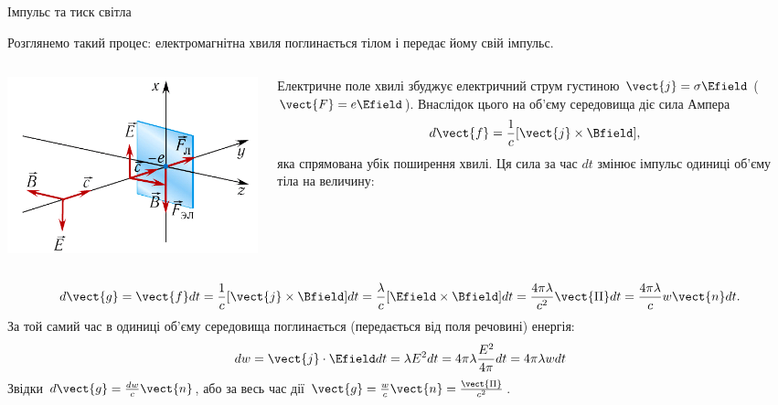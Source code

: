 \documentclass[onlytextwidth]{beamer}
\begin{document}
\begin{frame}{Імпульс та тиск світла}{}
\begin{block}{}
    Розглянемо такий процес: електромагнітна хвиля поглинається тілом і передає йому свій імпульс.
\end{block}
	\begin{columns}
		\begin{column}{0.3\linewidth}
			\begin{center}
				\includegraphics[width=1\linewidth]{pictures/elmagpresure}
			\end{center}
		\end{column}
		\begin{column}{0.7\linewidth}
			\begin{block}{}\justifying\small
				Електричне поле хвилі збуджує електричний струм густиною $ \vect{j} = \sigma\Efield $ ($ \vect{F} = e\Efield $). Внаслідок цього на
				об'єму середовища діє сила Ампера
                \begin{equation*}
                    d\vect{f} = \frac1c[\vect{j}\times\Bfield],
                \end{equation*}
        яка спрямована убік поширення хвилі. Ця сила за час $dt$ змінює імпульс одиниці об'єму тіла на величину:

			\end{block}
		\end{column}
	\end{columns}
\begin{block}{}\justifying
\begin{equation*}
    d\vect{g} = \vect{f} dt =  \frac1c[\vect{j}\times\Bfield] dt = \frac{\lambda}{c}[\Efield \times\Bfield]dt = \frac{4\pi\lambda}{c^2}\vect{\Pi}dt
    =
    \frac{4\pi\lambda}{c} w \vect{n} dt.
\end{equation*}
    За той самий час в одиниці об'єму середовища поглинається (передається від поля речовині) енергія:
\begin{equation*}
    dw = \vect{j}\cdot\Efield dt = \lambda E^2dt = 4\pi\lambda \frac{E^2}{4\pi} dt = 4\pi\lambda w dt
\end{equation*}
Звідки $d\vect{g} = \frac{dw}c \vect{n}$, або за весь час дії $\vect{g} = \frac{w}{c} \vect{n} = \frac{\vect{\Pi}}{c^2}$.
\end{block}
\end{frame}
\end{document}
